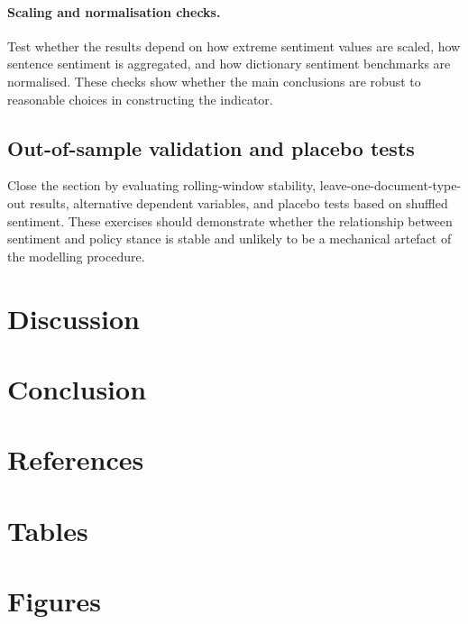 \documentclass[11pt]{article}
\begin{document}
\paragraph{Scaling and normalisation checks.} Test whether the results depend on how extreme sentiment values are scaled, how sentence sentiment is aggregated, and how dictionary sentiment benchmarks are normalised. These checks show whether the main conclusions are robust to reasonable choices in constructing the indicator.

\subsection{Out-of-sample validation and placebo tests} 

Close the section by evaluating rolling-window stability, leave-one-document-type-out results, alternative dependent variables, and placebo tests based on shuffled sentiment. These exercises should demonstrate whether the relationship between sentiment and policy stance is stable and unlikely to be a mechanical artefact of the modelling procedure.

\section{Discussion}
\section{Conclusion}

\clearpage
\section*{References}

\clearpage
\section*{Tables}

\clearpage
\section*{Figures}
\end{document}
